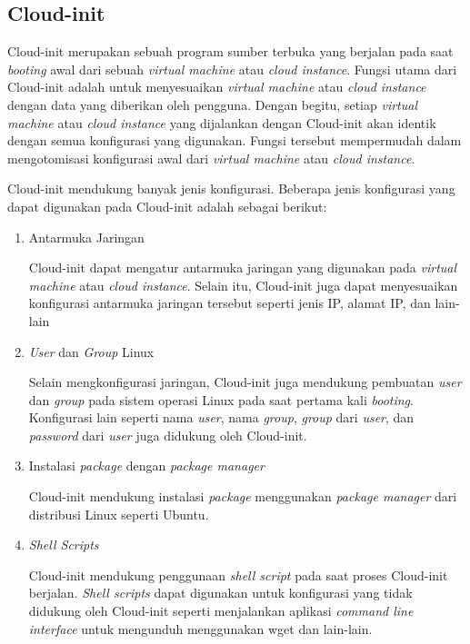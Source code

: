 \subsection{Cloud-init}

Cloud-init merupakan sebuah program sumber terbuka yang berjalan pada saat
\emph{booting} awal dari sebuah \emph{virtual machine} atau \emph{cloud instance}.
Fungsi utama dari Cloud-init adalah untuk menyesuaikan \emph{virtual machine}
atau \emph{cloud instance} dengan data yang diberikan oleh pengguna. Dengan begitu,
setiap \emph{virtual machine} atau \emph{cloud instance} yang dijalankan dengan Cloud-init
akan identik dengan semua konfigurasi yang digunakan. Fungsi tersebut mempermudah dalam 
mengotomisasi konfigurasi awal dari \emph{virtual machine} atau \emph{cloud instance}.

Cloud-init mendukung banyak jenis konfigurasi. Beberapa jenis konfigurasi yang dapat digunakan
pada Cloud-init adalah sebagai berikut:

\begin{enumerate}
  
  \item Antarmuka Jaringan

    Cloud-init dapat mengatur antarmuka jaringan yang digunakan pada \emph{virtual machine}
    atau \emph{cloud instance}. Selain itu, Cloud-init juga dapat menyesuaikan konfigurasi
    antarmuka jaringan tersebut seperti jenis IP, alamat IP, dan lain-lain

  \item \emph{User} dan \emph{Group} Linux

    Selain mengkonfigurasi jaringan, Cloud-init juga mendukung pembuatan \emph{user} dan \emph{group} pada
    sistem operasi Linux pada saat pertama kali \emph{booting}. Konfigurasi lain seperti nama \emph{user},
    nama \emph{group}, \emph{group} dari \emph{user}, dan \emph{password} dari \emph{user} juga didukung
    oleh Cloud-init.

  \item Instalasi \emph{package} dengan \emph{package manager}

    Cloud-init mendukung instalasi \emph{package} menggunakan \emph{package manager} dari distribusi Linux
    seperti Ubuntu. 

  \item \emph{Shell Scripts}

    Cloud-init mendukung penggunaan \emph{shell script} pada saat proses Cloud-init
    berjalan. \emph{Shell scripts} dapat digunakan untuk konfigurasi yang tidak didukung
    oleh Cloud-init seperti menjalankan aplikasi \emph{command line interface} untuk mengunduh
    menggunakan wget dan lain-lain.

\end{enumerate}

